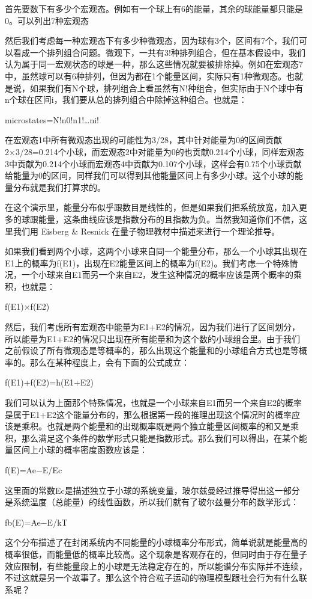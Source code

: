 \documentclass[
]{book}
\begin{document}
首先要数下有多少个宏观态。例如有一个球上有6的能量，其余的球能量都只能是0。可以列出7种宏观态

然后我们考虑每一种宏观态下有多少种微观态，因为球有3个，区间有7个，我们可以看成一个排列组合问题。微观下，一共有3!种排列组合，但在基本假设中，我们认为属于同一宏观状态的球是一种，那么这些情况就要被排除掉。例如在宏观态7中，虽然球可以有6种排列，但因为都在1个能量区间，实际只有1种微观态。也就是说，如果我们有N个球，排列组合上看虽然有N!种组合，但实际由于N个球中有n个球在区间i，我们要从总的排列组合中除掉这种组合。也就是：

microstates=N!n0!n1!\ldots ni!

在宏观态1中所有微观态出现的可能性为3/28，其中针对能量为0的区间贡献2×3/28=0.214个小球，而宏观态2中对能量为0的也贡献0.214个小球，同样宏观态3中贡献为0.214个小球而宏观态4中贡献为0.107个小球，这样会有0.75个小球贡献给能量为0的区间，同样我们可以得到其他能量区间上有多少小球。这个小球的能量分布就是我们打算求的。

在这个演示里，能量分布似乎跟数目是线性的，但是如果我们把系统放宽，加入更多的球跟能量，这条曲线应该是指数分布的且指数为负。当然我知道你们不信，这里我们用 Eisberg \& Resnick 在量子物理教材中描述来进行一个理论推导。

如果我们看到两个小球，这两个小球来自同一个能量分布，那么一个小球其出现在E1上的概率为f(E1)，出现在E2能量区间上的概率为f(E2)。我们考虑一个特殊情况，一个小球来自E1而另一个来自E2，发生这种情况的概率应该是两个概率的乘积，也就是：

f(E1)×f(E2)

然后，我们考虑所有宏观态中能量为E1+E2的情况，因为我们进行了区间划分，所以能量为E1+E2的情况只出现在所有能量和为这个数的小球组合里。由于我们之前假设了所有微观态是等概率的，那么出现这个能量和的小球组合方式也是等概率的。那么在某种程度上，会有下面的公式成立：

f(E1)+f(E2)=h(E1+E2)

我们可以认为上面那个特殊情况，也就是一个小球来自E1而另一个来自E2的概率是属于E1+E2这个能量分布的，那么根据第一段的推理出现这个情况时的概率应该是乘积。也就是两个能量和的出现概率既是两个独立能量区间概率的和又是乘积，那么满足这个条件的数学形式只能是指数形式。那么我们可以得出，在某个能量区间上小球的概率密度函数应该是：

f(E)=Ae−E/Ec

这里面的常数Ec是描述独立于小球的系统变量，玻尔兹曼经过推导得出这一部分是系统温度（总能量）的线性函数，所以我们就有了玻尔兹曼分布的数学形式：

fb(E)=Ae−E/kT

这个分布描述了在封闭系统内不同能量的小球概率分布形式，简单说就是能量高的概率很低，而能量低的概率比较高。这个现象是客观存在的，但同时由于存在量子效应限制，有些能量段上的小球是无法稳定存在的，所以能谱分布实际并不连续，不过这就是另一个故事了。那么这个符合粒子运动的物理模型跟社会行为有什么联系呢？
\end{document}
